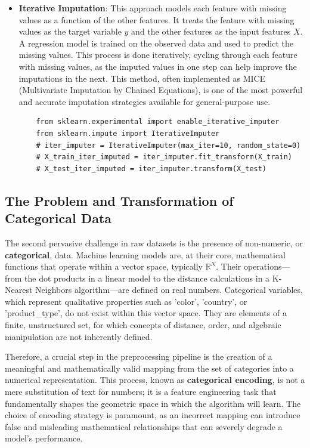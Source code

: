 \begin{itemize}
\begin{itemize}
    \item \textbf{Iterative Imputation}: This approach models each feature with missing values as a function of the other features. It treats the feature with missing values as the target variable $y$ and the other features as the input features $X$. A regression model is trained on the observed data and used to predict the missing values. This process is done iteratively, cycling through each feature with missing values, as the imputed values in one step can help improve the imputations in the next. This method, often implemented as MICE (Multivariate Imputation by Chained Equations), is one of the most powerful and accurate imputation strategies available for general-purpose use.
    \begin{verbatim}
    from sklearn.experimental import enable_iterative_imputer
    from sklearn.impute import IterativeImputer
    # iter_imputer = IterativeImputer(max_iter=10, random_state=0)
    # X_train_iter_imputed = iter_imputer.fit_transform(X_train)
    # X_test_iter_imputed = iter_imputer.transform(X_test)
    \end{verbatim}
\end{itemize}

\subsection{The Problem and Transformation of Categorical Data}
\label{subsec:categorical_data_problem}
The second pervasive challenge in raw datasets is the presence of non-numeric, or \textbf{categorical}, data. Machine learning models are, at their core, mathematical functions that operate within a vector space, typically $\mathbb{R}^N$. Their operations—from the dot products in a linear model to the distance calculations in a K-Nearest Neighbors algorithm—are defined on real numbers. Categorical variables, which represent qualitative properties such as 'color', 'country', or 'product\_type', do not exist within this vector space. They are elements of a finite, unstructured set, for which concepts of distance, order, and algebraic manipulation are not inherently defined.

Therefore, a crucial step in the preprocessing pipeline is the creation of a meaningful and mathematically valid mapping from the set of categories into a numerical representation. This process, known as \textbf{categorical encoding}, is not a mere substitution of text for numbers; it is a feature engineering task that fundamentally shapes the geometric space in which the algorithm will learn. The choice of encoding strategy is paramount, as an incorrect mapping can introduce false and misleading mathematical relationships that can severely degrade a model's performance.


\end{itemize}

